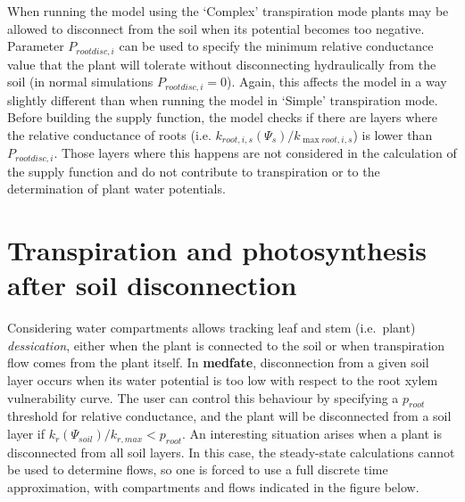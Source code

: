 \documentclass[]{book}
\begin{document}
When running the model using the `Complex' transpiration mode plants may
be allowed to disconnect from the soil when its potential becomes too
negative. Parameter \(P_{rootdisc,i}\) can be used to specify the
minimum relative conductance value that the plant will tolerate without
disconnecting hydraulically from the soil (in normal simulations
\(P_{rootdisc,i} = 0\)). Again, this affects the model in a way slightly
different than when running the model in `Simple' transpiration mode.
Before building the supply function, the model checks if there are
layers where the relative conductance of roots (i.e.
\(k_{root, i, s}(\Psi_{s})/k_{\max root, i, s}\)) is lower than
\(P_{rootdisc,i}\). Those layers where this happens are not considered
in the calculation of the supply function and do not contribute to
transpiration or to the determination of plant water potentials.

\section{Transpiration and photosynthesis after soil
disconnection}\label{transpiration-and-photosynthesis-after-soil-disconnection}

Considering water compartments allows tracking leaf and stem
(i.e.~plant) \emph{dessication}, either when the plant is connected to
the soil or when transpiration flow comes from the plant itself. In
\textbf{medfate}, disconnection from a given soil layer occurs when its
water potential is too low with respect to the root xylem vulnerability
curve. The user can control this behaviour by specifying a \(p_{root}\)
threshold for relative conductance, and the plant will be disconnected
from a soil layer if \(k_{r}(\Psi_{soil})/k_{r,max} < p_{root}\). An
interesting situation arises when a plant is disconnected from all soil
layers. In this case, the steady-state calculations cannot be used to
determine flows, so one is forced to use a full discrete time
approximation, with compartments and flows indicated in the figure
below.
\end{document}
